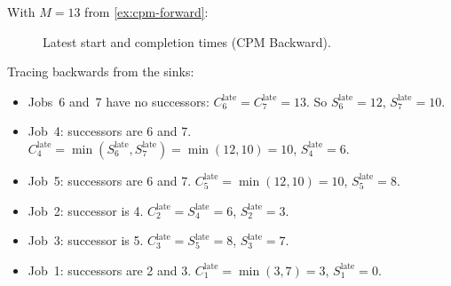 \begin{example}
\label{ex:cpm-backward}
With $M = 13$ from \cref{ex:cpm-forward}:

\begin{figure}[H]
\centering
{}
\caption{Latest start and completion times (CPM Backward).}
\label{fig:cpm-backward-table}
\end{figure}

\noindent
Tracing backwards from the sinks:
\begin{itemize}[nosep]
  \item Jobs~6 and~7 have no successors:
        $C_6^{\text{late}} = C_7^{\text{late}} = 13$.
        So $S_6^{\text{late}} = 12$, $S_7^{\text{late}} = 10$.
  \item Job~4: successors are 6 and 7.
        $C_4^{\text{late}} = \min(S_6^{\text{late}},
        S_7^{\text{late}}) = \min(12, 10) = 10$,
        $S_4^{\text{late}} = 6$.
  \item Job~5: successors are 6 and 7.
        $C_5^{\text{late}} = \min(12, 10) = 10$,
        $S_5^{\text{late}} = 8$.
  \item Job~2: successor is 4.
        $C_2^{\text{late}} = S_4^{\text{late}} = 6$,
        $S_2^{\text{late}} = 3$.
  \item Job~3: successor is 5.
        $C_3^{\text{late}} = S_5^{\text{late}} = 8$,
        $S_3^{\text{late}} = 7$.
  \item Job~1: successors are 2 and 3.
        $C_1^{\text{late}} = \min(3, 7) = 3$,
        $S_1^{\text{late}} = 0$.
\end{itemize}
\end{example}

